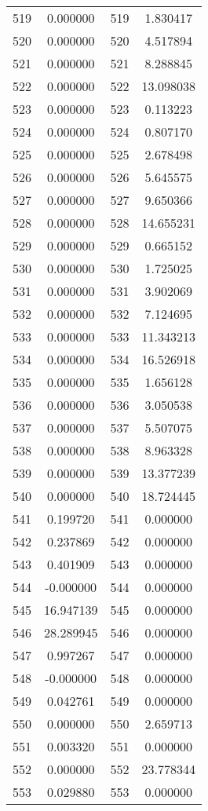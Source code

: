 \documentclass[12pt]{article}
\begin{document}
\begin{longtable}{@{}cccc@{}}
519 & 0.000000 & 519 & 1.830417 \\
520 & 0.000000 & 520 & 4.517894 \\
521 & 0.000000 & 521 & 8.288845 \\
522 & 0.000000 & 522 & 13.098038 \\
523 & 0.000000 & 523 & 0.113223 \\
524 & 0.000000 & 524 & 0.807170 \\
525 & 0.000000 & 525 & 2.678498 \\
526 & 0.000000 & 526 & 5.645575 \\
527 & 0.000000 & 527 & 9.650366 \\
528 & 0.000000 & 528 & 14.655231 \\
529 & 0.000000 & 529 & 0.665152 \\
530 & 0.000000 & 530 & 1.725025 \\
531 & 0.000000 & 531 & 3.902069 \\
532 & 0.000000 & 532 & 7.124695 \\
533 & 0.000000 & 533 & 11.343213 \\
534 & 0.000000 & 534 & 16.526918 \\
535 & 0.000000 & 535 & 1.656128 \\
536 & 0.000000 & 536 & 3.050538 \\
537 & 0.000000 & 537 & 5.507075 \\
538 & 0.000000 & 538 & 8.963328 \\
539 & 0.000000 & 539 & 13.377239 \\
540 & 0.000000 & 540 & 18.724445 \\
541 & 0.199720 & 541 & 0.000000 \\
542 & 0.237869 & 542 & 0.000000 \\
543 & 0.401909 & 543 & 0.000000 \\
544 & -0.000000 & 544 & 0.000000 \\
545 & 16.947139 & 545 & 0.000000 \\
546 & 28.289945 & 546 & 0.000000 \\
547 & 0.997267 & 547 & 0.000000 \\
548 & -0.000000 & 548 & 0.000000 \\
549 & 0.042761 & 549 & 0.000000 \\
550 & 0.000000 & 550 & 2.659713 \\
551 & 0.003320 & 551 & 0.000000 \\
552 & 0.000000 & 552 & 23.778344 \\
553 & 0.029880 & 553 & 0.000000 \\

\end{longtable}
\end{document}

